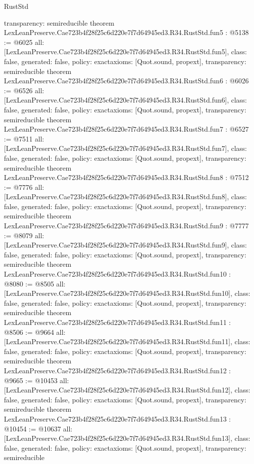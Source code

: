\begin{lexlean}{RustStd}
\begin{coremodule}
{  transparency: semireducible
}
theorem LexLeanPreserve.Cae723b4f28f25c6d220e7f7d64945ed3.R34.RustStd.fun5 : @5138 := @6025 {
  all: [LexLeanPreserve.Cae723b4f28f25c6d220e7f7d64945ed3.R34.RustStd.fun5],
  class: false,
  generated: false,
  policy: exact{axioms: [Quot.sound, propext]},
  transparency: semireducible
}
theorem LexLeanPreserve.Cae723b4f28f25c6d220e7f7d64945ed3.R34.RustStd.fun6 : @6026 := @6526 {
  all: [LexLeanPreserve.Cae723b4f28f25c6d220e7f7d64945ed3.R34.RustStd.fun6],
  class: false,
  generated: false,
  policy: exact{axioms: [Quot.sound, propext]},
  transparency: semireducible
}
theorem LexLeanPreserve.Cae723b4f28f25c6d220e7f7d64945ed3.R34.RustStd.fun7 : @6527 := @7511 {
  all: [LexLeanPreserve.Cae723b4f28f25c6d220e7f7d64945ed3.R34.RustStd.fun7],
  class: false,
  generated: false,
  policy: exact{axioms: [Quot.sound, propext]},
  transparency: semireducible
}
theorem LexLeanPreserve.Cae723b4f28f25c6d220e7f7d64945ed3.R34.RustStd.fun8 : @7512 := @7776 {
  all: [LexLeanPreserve.Cae723b4f28f25c6d220e7f7d64945ed3.R34.RustStd.fun8],
  class: false,
  generated: false,
  policy: exact{axioms: [Quot.sound, propext]},
  transparency: semireducible
}
theorem LexLeanPreserve.Cae723b4f28f25c6d220e7f7d64945ed3.R34.RustStd.fun9 : @7777 := @8079 {
  all: [LexLeanPreserve.Cae723b4f28f25c6d220e7f7d64945ed3.R34.RustStd.fun9],
  class: false,
  generated: false,
  policy: exact{axioms: [Quot.sound, propext]},
  transparency: semireducible
}
theorem LexLeanPreserve.Cae723b4f28f25c6d220e7f7d64945ed3.R34.RustStd.fun10 : @8080 := @8505 {
  all: [LexLeanPreserve.Cae723b4f28f25c6d220e7f7d64945ed3.R34.RustStd.fun10],
  class: false,
  generated: false,
  policy: exact{axioms: [Quot.sound, propext]},
  transparency: semireducible
}
theorem LexLeanPreserve.Cae723b4f28f25c6d220e7f7d64945ed3.R34.RustStd.fun11 : @8506 := @9664 {
  all: [LexLeanPreserve.Cae723b4f28f25c6d220e7f7d64945ed3.R34.RustStd.fun11],
  class: false,
  generated: false,
  policy: exact{axioms: [Quot.sound, propext]},
  transparency: semireducible
}
theorem LexLeanPreserve.Cae723b4f28f25c6d220e7f7d64945ed3.R34.RustStd.fun12 : @9665 := @10453 {
  all: [LexLeanPreserve.Cae723b4f28f25c6d220e7f7d64945ed3.R34.RustStd.fun12],
  class: false,
  generated: false,
  policy: exact{axioms: [Quot.sound, propext]},
  transparency: semireducible
}
theorem LexLeanPreserve.Cae723b4f28f25c6d220e7f7d64945ed3.R34.RustStd.fun13 : @10454 := @10637 {
  all: [LexLeanPreserve.Cae723b4f28f25c6d220e7f7d64945ed3.R34.RustStd.fun13],
  class: false,
  generated: false,
  policy: exact{axioms: [Quot.sound, propext]},
  transparency: semireducible
}
\end{coremodule}
\end{lexlean}
